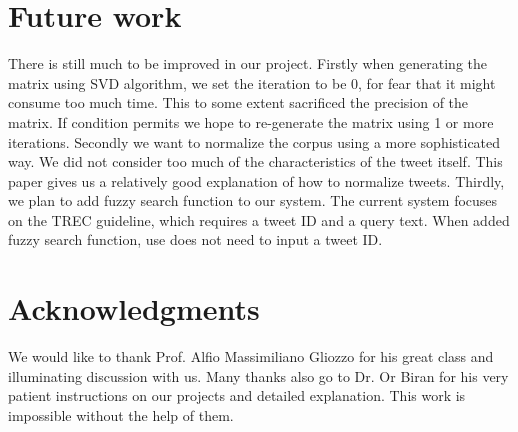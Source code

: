 \documentclass{acm_proc_article-sp}
\begin{document}
\section{Future work}
There is still much to be improved in our project. Firstly when generating the matrix using SVD algorithm, we set the iteration to be 0, for fear that it might consume too much time. This to some extent sacrificed the precision of the matrix. If condition permits we hope to re-generate the matrix using 1 or more iterations. Secondly we want to normalize the corpus using a more sophisticated way. We did not consider too much of the characteristics of the tweet itself. This paper \cite{han2011lexical} gives us a relatively good explanation of how to normalize tweets. Thirdly, we plan to add fuzzy search function to our system. The current system focuses on the TREC guideline, which requires a tweet ID and a query text. When added fuzzy search function, use does not need to input a tweet ID. 

\section{Acknowledgments}
We would like to thank Prof. Alfio Massimiliano Gliozzo for his great class and illuminating discussion with us. Many thanks also go to Dr. Or Biran for his very patient instructions on our projects and detailed explanation. This work is impossible without the help of them. 



\balancecolumns
\end{document}
